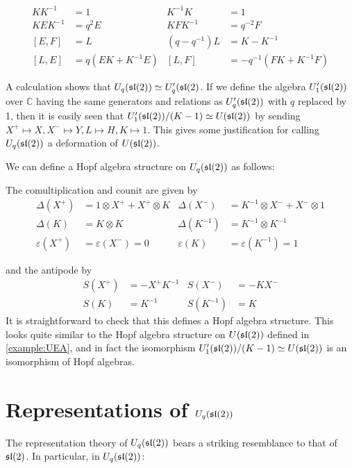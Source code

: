 \begin{align}
    KK^{-1} &= 1 &  K^{-1}K  &=1 \\
    KEK^{-1} &= q^2 E & KFK^{-1} &= q^{-2} F \\
    [E,F] &= L  & (q - q^{-1})L &= K-K^{-1} \\
    [L,E] &= q(EK + K^{-1}E) & [L,F] &= -q^{-1}(FK + K^{-1}F)
\end{align}

A calculation shows that $U_q(\mathfrak{sl}(2)) \simeq U_q'(\mathfrak{sl}(2)$. If we define the
algebra $U_1'(\mathfrak{sl}(2))$ over $\mathbb{C}$ having the same generators and
relations as $U_q'(\mathfrak{sl}(2))$ with $q$ replaced by 1, then it is easily seen
that $U_1'(\mathfrak{sl}(2)) /(K-1) \simeq U(\mathfrak{sl}(2))$ by sending $X^+ \mapsto X, X^-
\mapsto Y, L \mapsto H, K \mapsto 1$. This gives some  justification for
calling $U_q(\mathfrak{sl}(2))$ a deformation of $U(\mathfrak{sl}(2))$.

We can define a Hopf algebra structure on $U_q(\mathfrak{sl}(2))$ as follows:

The comultiplication and counit are given by
\begin{align}
    \Delta(X^+) &= 1 \otimes  X^+  +  X^+  \otimes K &  \Delta(X^-) &= K^{-1} \otimes X^- + X^- \otimes 1 \\
    \Delta(K) &= K \otimes K &  \Delta(K^{-1}) &= K^{-1} \otimes K^{-1}\\ 
    \varepsilon( X^+ ) &= \varepsilon(X^-) = 0 &  \varepsilon(K) &= \varepsilon(K^{-1}) = 1
\end{align}

and the antipode by
\begin{align}
    S(X^+) &= - X^+ K^{-1} & S(X^-)      &= -KX^- \\
    S(K) &= K^{-1}   & S(K^{-1}) &= K 
\end{align}
It is straightforward to check that this defines a Hopf algebra structure. This
looks quite similar to the Hopf algebra structure on $U(\mathfrak{sl}(2))$ defined in
\ref{example:UEA}, and in fact the isomorphism $U_1'(\mathfrak{sl}(2)) /(K-1)
\simeq U(\mathfrak{sl}(2))$ is an isomorphism of Hopf algebras.

\section{Representations of $U_q(\mathfrak{sl}(2))$}

The representation theory of $U_q(\mathfrak{sl}(2))$ bears a striking resemblance to
that of $\mathfrak{sl}(2)$. In particular, in $U_q(\mathfrak{sl}(2))$:

